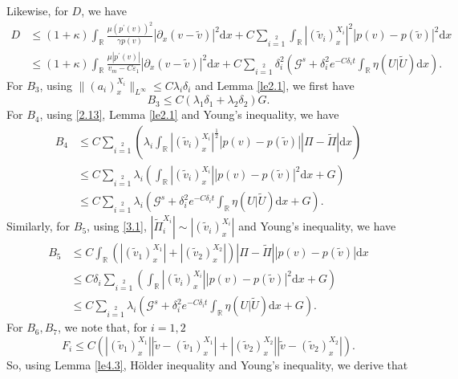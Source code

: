 \documentclass[10pt,reqno]{amsart}
\numberwithin{equation}{section}
\newcommand{\dif}{\mathrm{d}}
\begin{document}
Likewise, for $D$, we have
\begin{align*}
D&\le (1+\kappa)\int_\mathbb{R}\frac{\mu(p^\prime(v))^2}{\gamma p(v)}|\partial_x(v-\widetilde{v})|^2\dif x+
C\sum\limits_{i=1}\limits^2\int_\mathbb{R}|(\widetilde{v}_i)_x^{X_i}|^2|p(v)-p(\widetilde{v})|^2\dif x\\
&\le (1+\kappa)\int_\mathbb{R}\frac{\mu|p^\prime(v)|}{v_m-C\varepsilon_1}|\partial_x(v-\widetilde{v})|^2\dif x
+C\sum\limits_{i=1}\limits^2\delta_i^2\left(\mathcal{G}^s+\delta_i^2e^{-C\delta_i t}\int_{\mathbb{R}}\eta(U|\widetilde U)\dif x\right).
\end{align*}
For $B_3$, using $\|(a_i)_{x}^{X_i}\|_{L^\infty}\le C\lambda_i\delta_i$ and Lemma \ref{le2.1}, we first have
\[
B_3\le C(\lambda_1\delta_1+\lambda_2\delta_2)G.
\]
For $B_4$, using \eqref{2.13}, Lemma \ref{le2.1} and Young's inequality, we have
\begin{align*}
B_4&\le C\sum\limits_{i=1}\limits^2
   \left(\lambda_i\int_\mathbb{R}|(\widetilde{v}_i)^{X_i}_{x}|^{\frac{1}{2}}|p(v)-p(\widetilde{v})|
   |\Pi-\widetilde{\Pi}|\dif x\right)\\
&\le C\sum\limits_{i=1}\limits^2\lambda_i
   \left(\int_\mathbb{R}|(\widetilde{v}_i)^{X_i}_{x}||p(v)-p(\widetilde{v})|^2
   \dif x+G\right)\\
&\le C\sum\limits_{i=1}\limits^2\lambda_i
   \left(\mathcal{G}^s+\delta_i^2e^{-C\delta_i t}\int_{\mathbb{R}}\eta(U|\widetilde U)\dif x+G\right).
\end{align*}
Similarly, for $B_5$, using \eqref{3.1}, $|\widetilde{\Pi}_i^{X_i}|\sim|(\widetilde{v}_i)^{X_i}_x|$ and Young's inequality, we have
\begin{align*}
B_5&\le C\int_\mathbb{R}(|(\widetilde{v}_1)^{X_1}_x|+|(\widetilde{v}_2)^{X_2}_x|)
|\Pi-\widetilde{\Pi}||p(v)-p(\widetilde{v})|\dif x\\
&\le C\delta_i\sum\limits_{i=1}\limits^2
   \left(\int_\mathbb{R}|(\widetilde{v}_i)^{X_i}_{x}||p(v)-p(\widetilde{v})|^2\dif x+G\right)\\
&\le C\sum\limits_{i=1}\limits^2\lambda_i
   \left(\mathcal{G}^s+\delta_i^2e^{-C\delta_i t}\int_{\mathbb{R}}\eta(U|\widetilde U)\dif x+G\right).
\end{align*}
For $B_6,B_7$, we note that, for $i=1,2$
\begin{equation}\label{4.9}
F_i\le C\left(|(\widetilde{v}_1)^{X_1}_x||\widetilde{v}-(\widetilde{v}_1)^{X_1}_x|
+|(\widetilde{v}_2)^{X_2}_x||\widetilde{v}-(\widetilde{v}_2)^{X_2}_x|\right).
\end{equation}
So, using Lemma \ref{le4.3}, H\"{o}lder inequality and Young's inequality, we derive that
\end{document}
